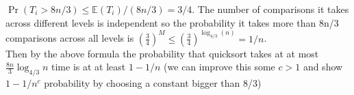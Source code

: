 \documentclass[11pt]{article}
\begin{document}
\begin{solution}
\begin{enumerate}
$\Pr(T_i > 8n/3) \leq \mathbb{E}(T_i)/(8n/3) = 3/4$. The number of comparisons it takes across different levels is independent so the probability it takes more than 8n/3 comparisons across all levels is $(\frac{3}{4})^M \leq (\frac{3}{4})^{\log_{4/3}(n)} = 1/n$. \\
Then by the above formula the probability that quicksort takes at at most $\frac{8n}{3}\log_{4/3}n$ time is at at least $1- 1/n$ (we can improve this some $c >1$ and show $1 - 1/n^c$ probability by choosing a constant bigger than 8/3)
    
\end{enumerate}



\end{solution}
\end{document}
